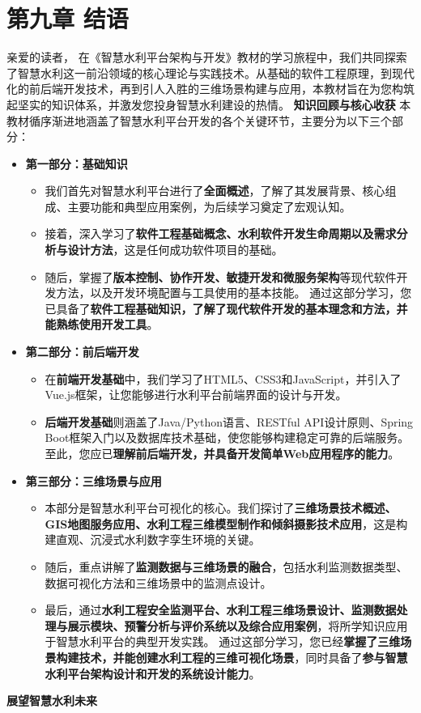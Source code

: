 \section{\texorpdfstring{\textbf{第九章 结语}}{第九章 结语}}\label{ux7b2cux4e5dux7ae0-ux7ed3ux8bed} 亲爱的读者， 在《智慧水利平台架构与开发》教材的学习旅程中，我们共同探索了智慧水利这一前沿领域的核心理论与实践技术。从基础的软件工程原理，到现代化的前后端开发技术，再到引人入胜的三维场景构建与应用，本教材旨在为您构筑起坚实的知识体系，并激发您投身智慧水利建设的热情。 \textbf{知识回顾与核心收获} 本教材循序渐进地涵盖了智慧水利平台开发的各个关键环节，主要分为以下三个部分： \begin{itemize} \item \textbf{第一部分：基础知识} \begin{itemize} \item 我们首先对智慧水利平台进行了\textbf{全面概述}，了解了其发展背景、核心组成、主要功能和典型应用案例，为后续学习奠定了宏观认知。 \item 接着，深入学习了\textbf{软件工程基础概念、水利软件开发生命周期以及需求分析与设计方法}，这是任何成功软件项目的基础。 \item 随后，掌握了\textbf{版本控制、协作开发、敏捷开发和微服务架构}等现代软件开发方法，以及开发环境配置与工具使用的基本技能。 通过这部分学习，您已具备了\textbf{软件工程基础知识，了解了现代软件开发的基本理念和方法，并能熟练使用开发工具}。 \end{itemize} \item \textbf{第二部分：前后端开发} \begin{itemize} \item 在\textbf{前端开发基础}中，我们学习了HTML5、CSS3和JavaScript，并引入了Vue.js框架，让您能够进行水利平台前端界面的设计与开发。 \item \textbf{后端开发基础}则涵盖了Java/Python语言、RESTful API设计原则、Spring Boot框架入门以及数据库技术基础，使您能够构建稳定可靠的后端服务。 至此，您应已\textbf{理解前后端开发，并具备开发简单Web应用程序的能力}。 \end{itemize} \item \textbf{第三部分：三维场景与应用} \begin{itemize} \item 本部分是智慧水利平台可视化的核心。我们探讨了\textbf{三维场景技术概述、GIS地图服务应用、水利工程三维模型制作和倾斜摄影技术应用}，这是构建直观、沉浸式水利数字孪生环境的关键。 \item 随后，重点讲解了\textbf{监测数据与三维场景的融合}，包括水利监测数据类型、数据可视化方法和三维场景中的监测点设计。 \item 最后，通过\textbf{水利工程安全监测平台、水利工程三维场景设计、监测数据处理与展示模块、预警分析与评价系统以及综合应用案例}，将所学知识应用于智慧水利平台的典型开发实践。 通过这部分学习，您已经\textbf{掌握了三维场景构建技术，并能创建水利工程的三维可视化场景}，同时具备了\textbf{参与智慧水利平台架构设计和开发的系统设计能力}。 \end{itemize} \end{itemize} \textbf{展望智慧水利未来} 